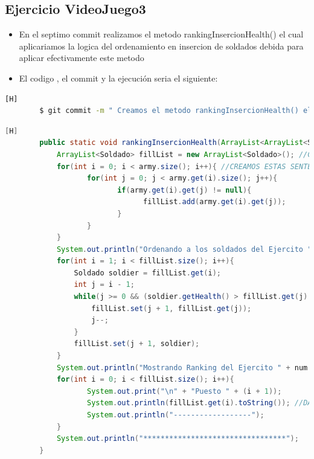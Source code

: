 \documentclass{article}
\begin{document}
	\subsection{Ejercicio VideoJuego3}
	\begin{itemize}	
		\item En el septimo commit realizamos el metodo rankingInsercionHealth() el cual aplicariamos la logica del ordenamiento en insercion de soldados debida para aplicar efectivamente este metodo
		\item El codigo , el commit  y la ejecución seria el siguiente:
	\end{itemize}	
	\begin{lstlisting}[language=bash,caption={Commit}][H]
		$ git commit -m " Creamos el metodo rankingInsercionHealth() el cual aplicariamos la misma logica con burbuja pero en esta ves solo tendriamos que cambiar cosas para aplicar efectivamente este metodo"
	\end{lstlisting}	
	\begin{lstlisting}[language=java,caption={Las lineas de codigos del metodo creado:}][H]
		public static void rankingInsercionHealth(ArrayList<ArrayList<Soldado>> army, int num){
			ArrayList<Soldado> fillList = new ArrayList<Soldado>(); //CREAMOS ESTE ARRAYLIST PARA PODER GUARDAR A LOS SOLDADOS EN UN SOLO ARRAYLIST EL CUAL SEA EFECTIVO EL METODO INSERCION 
			for(int i = 0; i < army.size(); i++){ //CREAMOS ESTAS SENTENCIAS PARA PODER VERIFICAR EL NUMERO DE SOLDADOS Y TAMBIEN ANADIRLO EN EL ARRAYLIST CREADO PARA DESPUES PONER EL RANKING DE PUESTOS DE CADA UNO DE ESTOS SOLDADOS
				   for(int j = 0; j < army.get(i).size(); j++){
						  if(army.get(i).get(j) != null){
								fillList.add(army.get(i).get(j));
						  }
				   }
			}
			System.out.println("Ordenando a los soldados del Ejercito " + num + " por el insercion: "); //APLICAMOS EL METODO INSERCION CON LOS PUNTOS DE VIDA
			for(int i = 1; i < fillList.size(); i++){
				Soldado soldier = fillList.get(i);
				int j = i - 1;
				while(j >= 0 && (soldier.getHealth() > fillList.get(j).getHealth())){ //APLICAMOS EL METODO INSERCION
					fillList.set(j + 1, fillList.get(j));
					j--;
				}
				fillList.set(j + 1, soldier);
			}
			System.out.println("Mostrando Ranking del Ejercito " + num + "....."); //MOSTRADOR DE RANKING DE LOS SOLDADOS
			for(int i = 0; i < fillList.size(); i++){
				   System.out.print("\n" + "Puesto " + (i + 1));
				   System.out.println(fillList.get(i).toString()); //DAMOS A CONOCER SUS DATOS Y EL PUESTO EN EL RANKING
				   System.out.println("------------------");
			}
			System.out.println("*********************************");
		}
	\end{lstlisting}
\end{document}
